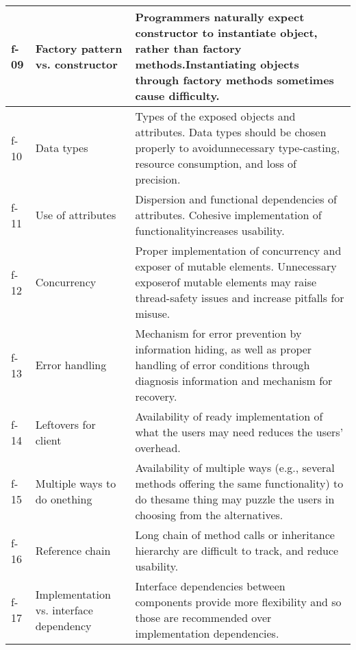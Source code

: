 \begin{table}[]
{\begin{tabularx}{\textwidth}{|l|L{3cm}|X|}
f-09  & Factory pattern vs. constructor         & Programmers naturally expect constructor to instantiate object, rather than factory methods.Instantiating objects through factory methods sometimes cause difficulty.         \\ \hline
f-10  & Data types                              & Types of the exposed objects and attributes. Data types should be chosen properly to avoidunnecessary type-casting, resource consumption, and loss of precision.              \\ \hline
f-11  & Use of attributes                       & Dispersion and functional dependencies of attributes. Cohesive implementation of functionalityincreases usability.                                                            \\ \hline
f-12  & Concurrency                             & Proper implementation of concurrency and exposer of mutable elements. Unnecessary exposerof mutable elements may raise thread-safety issues and increase pitfalls for misuse. \\ \hline
f-13  & Error handling                          & Mechanism for error prevention by information hiding, as well as proper handling of error conditions through diagnosis information and mechanism for recovery.                                                                                                                                                                              \\ \hline
f-14  & Leftovers for client                    & Availability of ready implementation of what the users may need reduces the users’ overhead.                                                                                  \\ \hline
f-15  & Multiple ways to do onething            & Availability of multiple ways (e.g., several methods offering the same functionality) to do thesame thing may puzzle the users in choosing from the alternatives.             \\ \hline
f-16  & Reference chain                         & Long chain of method calls or inheritance hierarchy are difficult to track, and reduce usability.                                                                             \\ \hline
f-17  & Implementation vs. interface dependency & Interface dependencies between components provide more flexibility and so those are recommended over implementation dependencies.                                             \\ \hline

\end{tabularx}}
\end{table}
